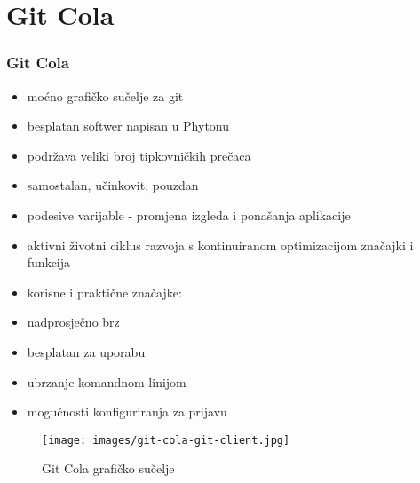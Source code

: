\section{Git Cola}
\begin{frame}[allowframebreaks]
\frametitle{Git Cola}
 
\begin{itemize}
 \item moćno grafičko sučelje za git
 \item besplatan softwer napisan u Phytonu
 \item podržava veliki broj tipkovničkih prečaca
 \item samostalan, učinkovit, pouzdan
 \item podesive varijable - promjena izgleda i ponašanja aplikacije
 \item aktivni životni ciklus razvoja s kontinuiranom optimizacijom značajki i funkcija
 \framebreak
 \item korisne i praktične značajke:
 		\item nadprosječno brz
 		\item besplatan za uporabu
 		\item ubrzanje komandnom linijom
 		\item mogućnosti konfiguriranja za prijavu
\end{itemize}


\end{frame}

\begin{figure}
	\texttt{[image: images/git-cola-git-client.jpg]}
	\caption{Git Cola grafičko sučelje}
\end{figure}
